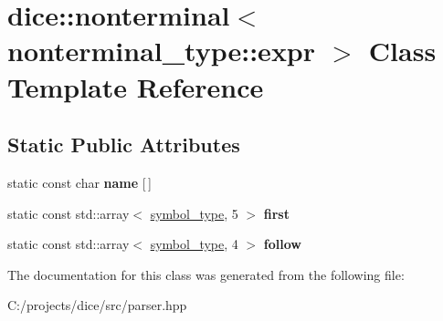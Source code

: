\hypertarget{classdice_1_1nonterminal_3_01nonterminal__type_1_1expr_01_4}{}\section{dice\+:\+:nonterminal$<$ nonterminal\+\_\+type\+:\+:expr $>$ Class Template Reference}
\label{classdice_1_1nonterminal_3_01nonterminal__type_1_1expr_01_4}
\subsection*{Static Public Attributes}
\begin{DoxyCompactItemize}
\item 
\mbox{\label{classdice_1_1nonterminal_3_01nonterminal__type_1_1expr_01_4_ae305b2458e6b9b30cfd60101b9858c93}} 
static const char {\bfseries name} \mbox{[}$\,$\mbox{]}
\item 
\mbox{\label{classdice_1_1nonterminal_3_01nonterminal__type_1_1expr_01_4_abae7eeaed72faff338531a172dc08588}} 
static const std\+::array$<$ \mbox{\hyperlink{symbols_8hpp_ab0295a855bb7eadc138abd6993af3aea}{symbol\+\_\+type}}, 5 $>$ {\bfseries first}
\item 
\mbox{\label{classdice_1_1nonterminal_3_01nonterminal__type_1_1expr_01_4_a0b7fbfaed00ca33514b97cacbf0db4dc}} 
static const std\+::array$<$ \mbox{\hyperlink{symbols_8hpp_ab0295a855bb7eadc138abd6993af3aea}{symbol\+\_\+type}}, 4 $>$ {\bfseries follow}
\end{DoxyCompactItemize}


The documentation for this class was generated from the following file\+:\begin{DoxyCompactItemize}
\item 
C\+:/projects/dice/src/parser.\+hpp\end{DoxyCompactItemize}
